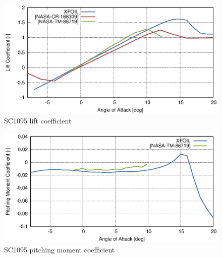 \begin{figure}[p]
  \centering
  \includegraphics[width=140mm]{eps/uh60_blade_sc1095_cz.eps}
  \caption{SC1095 lift coefficient}
\end{figure}

\begin{figure}[p]
  \centering
  \includegraphics[width=140mm]{eps/uh60_blade_sc1095_cm.eps}
  \caption{SC1095 pitching moment coefficient}
\end{figure}
